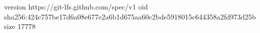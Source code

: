 version https://git-lfs.github.com/spec/v1
oid sha256:424c757be17d6a08e677e2a6b1d675aa60c2bde5918015c644358a2fd973d25b
size 17778
